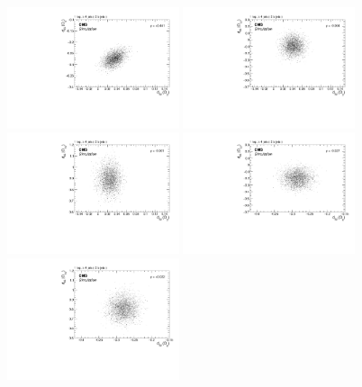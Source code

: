 \begin{figure}[!th]
    \centering
    \includegraphics[width=0.45\textwidth]{figure/Corr_Sim_co_obs3_6.pdf}
    \includegraphics[width=0.45\textwidth]{figure/Corr_Sim_co_obs3_12.pdf}
    \includegraphics[width=0.45\textwidth]{figure/Corr_Sim_co_obs3_14.pdf}
    \includegraphics[width=0.45\textwidth]{figure/Corr_Sim_co_obs6_12.pdf}
    \includegraphics[width=0.45\textwidth]{figure/Corr_Sim_co_obs6_14.pdf}

\end{figure}
